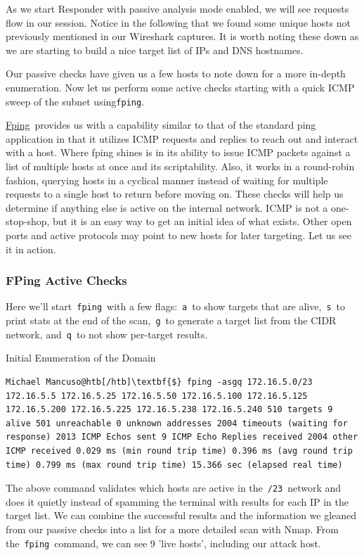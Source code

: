 As we start Responder with passive analysis mode enabled, we will see requests flow in our session. Notice in the following that we found some unique hosts not previously mentioned in our Wireshark captures. It is worth noting these down as we are starting to build a nice target list of IPs and DNS hostnames.

Our passive checks have given us a few hosts to note down for a more in-depth enumeration. Now let us perform some active checks starting with a quick ICMP sweep of the subnet using\verb|fping|.

\href{https://fping.org/}{Fping} provides us with a capability similar to that of the standard ping application in that it utilizes ICMP requests and replies to reach out and interact with a host. Where fping shines is in its ability to issue ICMP packets against a list of multiple hosts at once and its scriptability. Also, it works in a round-robin fashion, querying hosts in a cyclical manner instead of waiting for multiple requests to a single host to return before moving on. These checks will help us determine if anything else is active on the internal network. ICMP is not a one-stop-shop, but it is an easy way to get an initial idea of what exists. Other open ports and active protocols may point to new hosts for later targeting. Let us see it in action.

 \subsubsection{FPing Active Checks}
Here we’ll start \verb|fping| with a few flags: \verb|a| to show targets that are alive, \verb|s| to print stats at the end of the scan, \verb|g| to generate a target list from the CIDR network, and \verb|q| to not show per-target results.

Initial Enumeration of the Domain

\begin{verbatim}
Michael Mancuso@htb[/htb]\textbf{$} fping -asgq 172.16.5.0/23 172.16.5.5 172.16.5.25 172.16.5.50 172.16.5.100 172.16.5.125 172.16.5.200 172.16.5.225 172.16.5.238 172.16.5.240 510 targets 9 alive 501 unreachable 0 unknown addresses 2004 timeouts (waiting for response) 2013 ICMP Echos sent 9 ICMP Echo Replies received 2004 other ICMP received 0.029 ms (min round trip time) 0.396 ms (avg round trip time) 0.799 ms (max round trip time) 15.366 sec (elapsed real time) 
\end{verbatim}

The above command validates which hosts are active in the \verb|/23| network and does it quietly instead of spamming the terminal with results for each IP in the target list. We can combine the successful results and the information we gleaned from our passive checks into a list for a more detailed scan with Nmap. From the \verb|fping| command, we can see 9 'live hosts', including our attack host.

